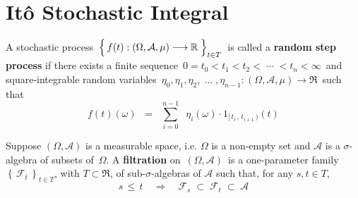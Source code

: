 

\section{It\^{o} Stochastic Integral}
\setcounter{theorem}{0}
\setcounter{equation}{0}


\renewcommand{\theenumi}{\roman{enumi}}
\renewcommand{\labelenumi}{\textnormal{(\theenumi)}$\;\;$}


\begin{definition}
\mbox{}
\vskip 0.1cm
\noindent
A stochastic process
\,$\left\{\,\overset{{\color{white}.}}{f}(t) : (\Omega,\mathcal{A},\mu) \longrightarrow \Re \;\right\}_{t \in T}$\,
is called a \textbf{random step process} if there exists a finite sequence
\,$0 = t_{0} < t_{1} < t_{2} < \;\cdots\; < t_{n} < \infty$\,
and square-integrable random variables
\,$\eta_{0}, \eta_{1}, \eta_{2}, \;\ldots\; ,\eta_{n-1} : (\Omega,\mathcal{A},\mu) \longrightarrow \Re$\,
such that
\begin{equation*}
f(t)(\omega)
\;\; = \;\;
	\overset{n-1}{\underset{i=0}{\sum}}\;\;
	\eta_{i}(\omega) \cdot 1_{[\,t_{i}\,,\,t_{i+1}\,)}(t)
\end{equation*}
\end{definition}


\begin{definition}[Filtration]
\mbox{}
\vskip 0.2cm
\noindent
Suppose $(\Omega,\mathcal{A})$ is a measurable space,
i.e. $\Omega$ is a non-empty set and $\mathcal{A}$ is a $\sigma$-algebra
of subsets of \,$\Omega$.
A \textbf{filtration} on \,$(\Omega,\mathcal{A})$\,
is a one-parameter family
$\left\{\,\mathcal{F}_{t}\,\right\}_{t \in T}$, with $T \subset \Re$,
of sub-$\sigma$-algebras of $\mathcal{A}$
such that, for any $s, t \in T$,
\begin{equation*}
s \,\leq\, t
\quad\Longrightarrow\quad
\mathcal{F}_{s} \; \subset \; \mathcal{F}_{t} \; \subset \; \mathcal{A}
\end{equation*}
\end{definition}


